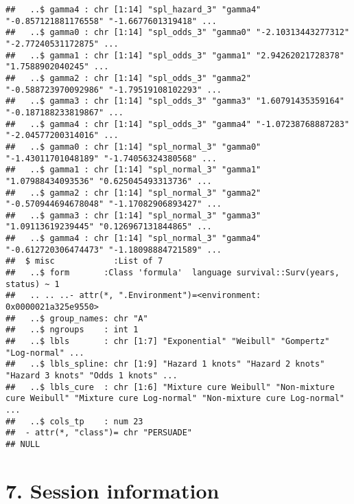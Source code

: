 \documentclass[
]{article}
\begin{document}
\begin{verbatim}
##   ..$ gamma4 : chr [1:14] "spl_hazard_3" "gamma4" "-0.857121881176558" "-1.6677601319418" ...
##   ..$ gamma0 : chr [1:14] "spl_odds_3" "gamma0" "-2.10313443277312" "-2.77240531172875" ...
##   ..$ gamma1 : chr [1:14] "spl_odds_3" "gamma1" "2.94262021728378" "1.7588902040245" ...
##   ..$ gamma2 : chr [1:14] "spl_odds_3" "gamma2" "-0.588723970092986" "-1.79519108102293" ...
##   ..$ gamma3 : chr [1:14] "spl_odds_3" "gamma3" "1.60791435359164" "-0.187188233819867" ...
##   ..$ gamma4 : chr [1:14] "spl_odds_3" "gamma4" "-1.07238768887283" "-2.04577200314016" ...
##   ..$ gamma0 : chr [1:14] "spl_normal_3" "gamma0" "-1.43011701048189" "-1.74056324380568" ...
##   ..$ gamma1 : chr [1:14] "spl_normal_3" "gamma1" "1.07988434093536" "0.625045493313736" ...
##   ..$ gamma2 : chr [1:14] "spl_normal_3" "gamma2" "-0.570944694678048" "-1.17082906893427" ...
##   ..$ gamma3 : chr [1:14] "spl_normal_3" "gamma3" "1.09113619239445" "0.126967131844865" ...
##   ..$ gamma4 : chr [1:14] "spl_normal_3" "gamma4" "-0.612720306474473" "-1.18098884721589" ...
##  $ misc            :List of 7
##   ..$ form       :Class 'formula'  language survival::Surv(years, status) ~ 1
##   .. .. ..- attr(*, ".Environment")=<environment: 0x0000021a325e9550> 
##   ..$ group_names: chr "A"
##   ..$ ngroups    : int 1
##   ..$ lbls       : chr [1:7] "Exponential" "Weibull" "Gompertz" "Log-normal" ...
##   ..$ lbls_spline: chr [1:9] "Hazard 1 knots" "Hazard 2 knots" "Hazard 3 knots" "Odds 1 knots" ...
##   ..$ lbls_cure  : chr [1:6] "Mixture cure Weibull" "Non-mixture cure Weibull" "Mixture cure Log-normal" "Non-mixture cure Log-normal" ...
##   ..$ cols_tp    : num 23
##  - attr(*, "class")= chr "PERSUADE"
## NULL
\end{verbatim}

\clearpage

\section{7. Session information}\label{session-information}
\end{document}
